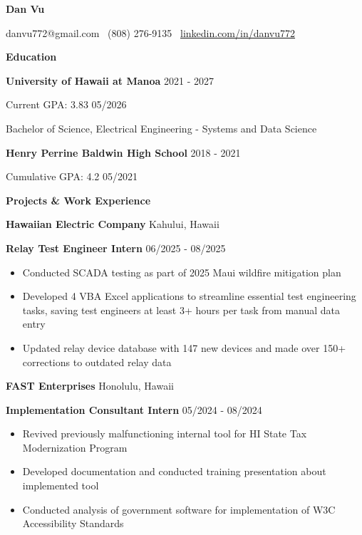\documentclass[11pt]{article}
\begin{document}
\begin{center}
    \textbf{Dan Vu}\\ 
    \hrulefill
\end{center}

\begin{center}
    danvu772@gmail.com \textbullet \ (808) 276-9135 \textbullet \ \href{https://linkedin.com/in/danvu772}{linkedin.com/in/danvu772}
\end{center}

\vspace{0.5pt}

\begin{center}
    \textbf{Education}
\end{center}

\textbf{University of Hawaii at Manoa} \hfill 2021 - 2027

Current GPA: 3.83 \hfill 05/2026

Bachelor of Science, Electrical Engineering - Systems and Data Science 

\vspace{12pt}

\textbf{Henry Perrine Baldwin High School} \hfill 2018 - 2021

Cumulative GPA: 4.2 \hfill 05/2021

\begin{center}
    \textbf{Projects \& Work Experience}
\end{center}

\textbf{Hawaiian Electric Company} \hfill Kahului, Hawaii

\textbf{Relay Test Engineer Intern } \hfill 06/2025 - 08/2025
\begin{itemize}[noitemsep, topsep=0pt, partopsep=0pt, parsep=0pt]
    \item Conducted SCADA testing as part of 2025 Maui wildfire mitigation plan
    \item Developed 4 VBA Excel applications to streamline essential test engineering tasks, saving test engineers at least 3+ hours per task from manual data entry
    \item Updated relay device database with 147 new devices and made over 150+ corrections to outdated relay data 
\end{itemize}

\vspace{12pt}

\textbf{FAST Enterprises} \hfill Honolulu, Hawaii

\textbf{Implementation Consultant Intern} \hfill 05/2024 - 08/2024
\begin{itemize}[noitemsep, topsep=0pt, partopsep=0pt, parsep=0pt]
    \item Revived previously malfunctioning internal tool for HI State Tax Modernization Program
    \item Developed documentation and conducted training presentation about implemented tool
    \item Conducted analysis of government software for implementation of W3C Accessibility Standards
\end{itemize}
\end{document}
